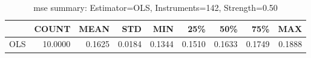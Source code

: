 \begin{table}[ht]
\centering
\caption{mse summary: Estimator=OLS, Instruments=142, Strength=0.50}
\begin{tabular}{lrrrrrrrr}
\toprule
 & COUNT & MEAN & STD & MIN & 25\% & 50\% & 75\% & MAX \\
\midrule
OLS & 10.0000 & 0.1625 & 0.0184 & 0.1344 & 0.1510 & 0.1633 & 0.1749 & 0.1888 \\
\bottomrule
\end{tabular}
\end{table}
